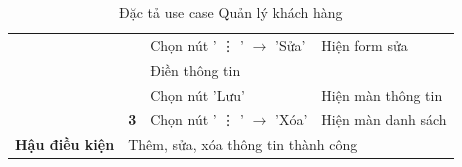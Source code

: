 \documentclass[../DoAn.tex]{subfiles}
\begin{document}
\begin{table}[H]
\begin{tabular}{|l|c|l|l|}
                                                &                                                                & Chọn nút ' \vdots{} ' $\rightarrow$ 'Sửa' & Hiện form sửa                                   \\ \cline{3-4}
                                                &                                                                & Điền thông tin                            &                                                 \\
                                                &                                                                & Chọn nút 'Lưu'                            & Hiện màn thông tin                              \\ \cline{2-4}
                                                & \multirow{1}{*}{\textbf{3}}                                    & Chọn nút ' \vdots{} ' $\rightarrow$ 'Xóa' & Hiện màn danh sách                              \\ \hline
        \textbf{Hậu điều kiện}                  & \multicolumn{3}{l|}{Thêm, sửa, xóa thông tin thành công}                                                                                                     \\ \hline
    \end{tabular}
    \caption{Đặc tả use case Quản lý khách hàng}
    \label{table:uc-client-manage}
\end{table}
\end{document}
